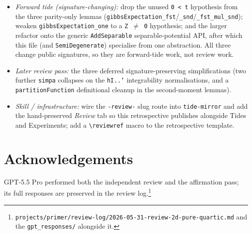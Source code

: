 \documentclass[11pt]{article}
\begin{document}
\begin{itemize}
\item \emph{Forward tide (signature-changing):} drop the unused \texttt{0 < t}
  hypothesis from the three parity-only lemmas
  (\texttt{gibbsExpectation\_fst}/\texttt{\_snd}/\texttt{\_fst\_mul\_snd}); weaken
  \texttt{gibbsExpectation\_one} to a \texttt{Z $\neq$ 0} hypothesis; and the larger
  refactor onto the generic \texttt{AddSeparable} separable-potential API, after
  which this file (and \texttt{SemiDegenerate}) specialise from one abstraction.
  All three change public signatures, so they are forward-tide work, not review work.
\item \emph{Later review pass:} the three deferred signature-preserving
  simplifications (two further \texttt{simpa} collapses on the \texttt{hI..'}
  integrability normalisations, and a \texttt{partitionFunction} definitional
  cleanup in the second-moment lemmas).
\item \emph{Skill / infrastructure:} wire the \texttt{-review-} slug route into
  \texttt{tide-mirror} and add the hand-preserved \emph{Review} tab so this
  retrospective publishes alongside Tides and Experiments; add a
  \texttt{\textbackslash reviewref} macro to the retrospective template.
\end{itemize}

\section*{Acknowledgements}

GPT-5.5 Pro performed both the independent review and the affirmation pass; its
full responses are preserved in the review
log.\footnote{\texttt{projects/primer/review-log/2026-05-31-review-2d-pure-quartic.md}
and the \texttt{gpt\_responses/} alongside it.}
\end{document}
